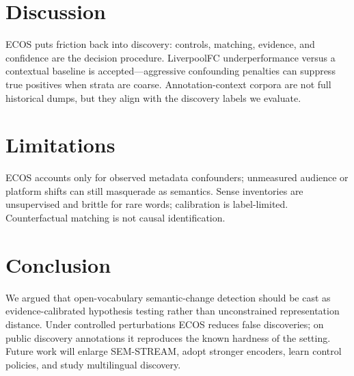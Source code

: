 \documentclass{llncs}
\begin{document}
\section{Discussion}
\label{sec:discussion}

ECOS puts friction back into discovery: controls, matching, evidence, and confidence are the decision procedure.
LiverpoolFC underperformance versus a contextual baseline is accepted---aggressive confounding penalties can suppress true positives when strata are coarse.
Annotation-context corpora are not full historical dumps, but they align with the discovery labels we evaluate.

\section{Limitations}
\label{sec:limits}

ECOS accounts only for observed metadata confounders; unmeasured audience or platform shifts can still masquerade as semantics.
Sense inventories are unsupervised and brittle for rare words; calibration is label-limited.
Counterfactual matching is not causal identification.

\section{Conclusion}
\label{sec:conclusion}

We argued that open-vocabulary semantic-change detection should be cast as evidence-calibrated hypothesis testing rather than unconstrained representation distance.
Under controlled perturbations ECOS reduces false discoveries; on public discovery annotations it reproduces the known hardness of the setting.
Future work will enlarge SEM-STREAM, adopt stronger encoders, learn control policies, and study multilingual discovery.
\end{document}
